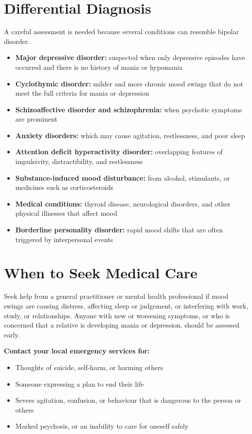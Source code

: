 \section*{Differential Diagnosis}
A careful assessment is needed because several conditions can resemble bipolar disorder.

\begin{itemize}
    \item \textbf{Major depressive disorder:} suspected when only depressive episodes have occurred and there is no history of mania or hypomania
    \item \textbf{Cyclothymic disorder:} milder and more chronic mood swings that do not meet the full criteria for mania or depression
    \item \textbf{Schizoaffective disorder and schizophrenia:} when psychotic symptoms are prominent
    \item \textbf{Anxiety disorders:} which may cause agitation, restlessness, and poor sleep
    \item \textbf{Attention deficit hyperactivity disorder:} overlapping features of impulsivity, distractibility, and restlessness
    \item \textbf{Substance-induced mood disturbance:} from alcohol, stimulants, or medicines such as corticosteroids
    \item \textbf{Medical conditions:} thyroid disease, neurological disorders, and other physical illnesses that affect mood
    \item \textbf{Borderline personality disorder:} rapid mood shifts that are often triggered by interpersonal events
\end{itemize}

\section*{When to Seek Medical Care}
Seek help from a general practitioner or mental health professional if mood swings are causing distress, affecting sleep or judgement, or interfering with work, study, or relationships. Anyone with new or worsening symptoms, or who is concerned that a relative is developing mania or depression, should be assessed early.

\textbf{Contact your local emergency services for:}
\begin{itemize}
    \item Thoughts of suicide, self-harm, or harming others
    \item Someone expressing a plan to end their life
    \item Severe agitation, confusion, or behaviour that is dangerous to the person or others
    \item Marked psychosis, or an inability to care for oneself safely
\end{itemize}

